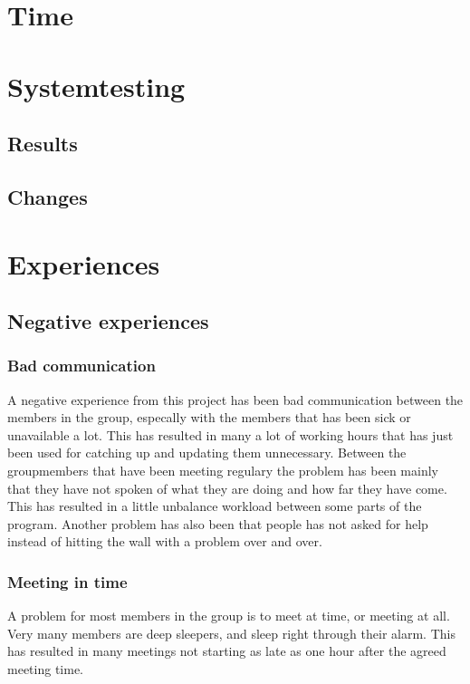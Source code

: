 \documentclass[a4paper, 10pt]{article}
\begin{document}

\thispagestyle{empty}

\setcounter{page}{0}
\newpage
\tableofcontents

\newpage
{}
\setcounter{page}{1}

\section{Time}

\section{Systemtesting}

\subsection{Results}

\subsection{Changes}

\section{Experiences}

\subsection{Negative experiences}
\subsubsection{Bad communication}
A negative experience from this project has been bad communication between the members in the group, especally with the members that has been sick or unavailable a lot. This has resulted in many a lot of working hours that has just been used for catching up and updating them unnecessary. Between the groupmembers that have been meeting regulary the problem has been mainly that they have not spoken of what they are doing and how far they have come. This has resulted in a little unbalance workload between some parts of the program. Another problem has also been that people has not asked for help instead of hitting the wall with a problem over and over.
\subsubsection{Meeting in time}
A problem for most members in the group is to meet at time, or meeting at all. Very many members are deep sleepers, and sleep right through their alarm. This has resulted in many meetings not starting as late as one hour after the agreed meeting time.
\end{document}
